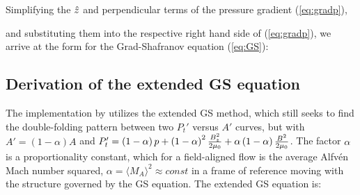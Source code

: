 \noindent Simplifying the $\hat{z}$ and perpendicular terms of the pressure gradient (\ref{eq:gradp}),

\noindent and substituting them into the respective right hand side of (\ref{eq:gradp}), we arrive at the form for the Grad-Shafranov equation (\ref{eq:GS}):


\subsection{Derivation of the extended GS equation}
The implementation by \cite{Chen:2021} utilizes the extended GS method, which still seeks to find the double-folding pattern between two $P_t'$ versus $A'$ curves, but with $A'=(1-\alpha)A$ and $P_t'=\left( 1-\alpha \right)p + \left( 1-\alpha \right)^2\frac{B_z^2}{2\mu_0} + \alpha\left( 1-\alpha \right)\frac{B^2}{2\mu_0}$.  The factor $\alpha$ is a proportionality constant, which for a field-aligned flow is the average Alfv\'en Mach number squared, $\alpha=\langle M_A\rangle^2 \approx const$ in a frame of reference moving with the structure governed by the GS equation. The extended GS equation \citep{Teh:2018, Sonnerup:2006} is:

